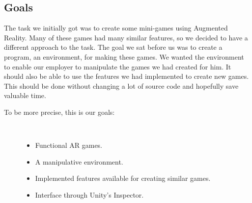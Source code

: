 \subsection{Goals}
\label{subsec:goals}
The task we initially got was to create some mini-games using \gls{Augmented Reality}. Many of these games had many similar features, so we decided to have a different approach to the task. The goal we sat before us was to create a program, an environment, for making these games. We wanted the environment to enable our employer to manipulate the games we had created for him. It should also be able to use the features we had implemented to create new games. This should be done without changing a lot of source code and hopefully save valuable time.


\begin{description}
	\item[To be more precise, this is our goals:]\ 
	\begin{itemize}
		\item Functional \gls{AR} games.
		\item A manipulative environment.
		\item Implemented features available for creating similar games. 
		\item Interface through Unity's \gls{Inspector}.
	\end{itemize}
\end{description}



